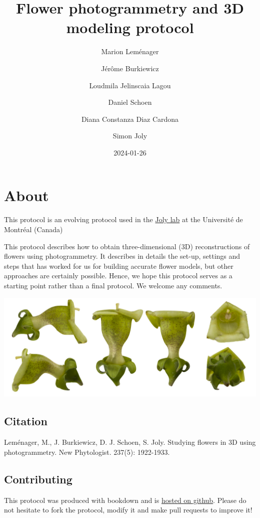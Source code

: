 \documentclass[
]{book}
\title{Flower photogrammetry and 3D modeling protocol}
\author{Marion Leménager \and Jérôme Burkiewicz \and Loudmila Jelinscaia Lagou \and Daniel Schoen \and Diana Constanza Diaz Cardona \and Simon Joly}
\date{2024-01-26}
\begin{document}
\maketitle

{
\setcounter{tocdepth}{1}
\tableofcontents
}
\hypertarget{about}{%
\chapter{About}\label{about}}

This protocol is an evolving protocol used in the \href{www.plantevolution.org}{Joly lab} at the Université de Montréal (Canada)

This protocol describes how to obtain three-dimensional (3D) reconstructions of flowers using photogrammetry. It describes in details the set-up, settings and steps that has worked for us for building accurate flower models, but other approaches are certainly possible. Hence, we hope this protocol serves as a starting point rather than a final protocol. We welcome any comments.

\includegraphics[width=1\textwidth,height=\textheight]{Figures/cover.jpg}

\hypertarget{citation}{%
\section{Citation}\label{citation}}

Leménager, M., J. Burkiewicz, D. J. Schoen, S. Joly. Studying flowers in 3D using photogrammetry. New Phytologist. 237(5): 1922-1933.

\hypertarget{contributing}{%
\section{Contributing}\label{contributing}}

This protocol was produced with bookdown and is \href{https://github.com/plantevolution/photogrammetry-protocol}{hosted on github}. Please do not hesitate to fork the protocol, modify it and make pull requests to improve it!
\end{document}
